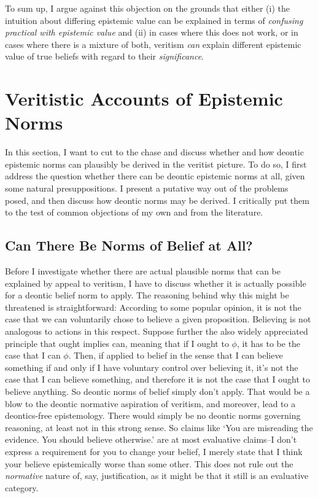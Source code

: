 \documentclass[12pt,numbers=noenddot]{scrartcl}
\begin{document}
To sum up, I argue against this objection on the grounds that either (i) the intuition about differing epistemic value can be explained in terms of \emph{confusing practical with epistemic value} and (ii) in cases where this does not work, or in cases where there is a mixture of both, veritism \emph{can} explain different epistemic value of true beliefs with regard to their \emph{significance}.

\clearpage
\section{Veritistic Accounts of Epistemic Norms}

In this section, I want to cut to the chase and discuss whether and how deontic epistemic norms can plausibly be derived in the veritist picture. To do so, I first address the question whether there can be deontic epistemic norms at all, given some natural presuppositions. I present a putative way out of the problems posed, and then discuss how deontic norms may be derived. I critically put them to the test of common objections of my own and from the literature.

\subsection{Can There Be Norms of Belief at All?}

Before I investigate whether there are actual plausible norms that can be explained by appeal to veritism, I have to discuss whether it is actually possible for a deontic belief norm to apply. The reasoning behind why this might be threatened is straightforward: According to some popular opinion, it is not the case that we can voluntarily chose to believe a given proposition. Believing is not analogous to actions in this respect. Suppose further the also widely appreciated principle that ought implies can, meaning that if I ought to $\phi$, it has to be the case that I can $\phi$. Then, if applied to belief in the sense that I can believe something if and only if I have voluntary control over believing it, it's not the case that I can believe something, and therefore it is not the case that I ought to believe anything. So deontic norms of belief simply don't apply. That would be a blow to the deontic normative aspiration of veritism, and moreover, lead to a deontics-free epistemology. There would simply be no deontic norms governing reasoning, at least not in this strong sense. So claims like ‘You are misreading the evidence. You should  believe otherwise.’ are at most evaluative claims–I don't express a requirement for you to change your belief, I merely state that I think your believe epistemically worse than some other. This does not rule out the \emph{normative} nature of, say, justification, as it might be that it still is an evaluative category.
\end{document}
